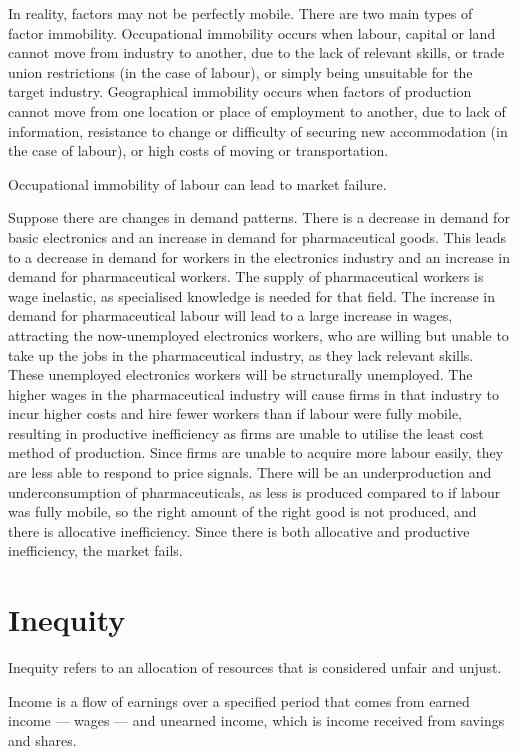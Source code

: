 \documentclass[Economics.tex]{subfiles}
\begin{document}
In reality, factors may not be perfectly mobile. There are two main types of factor immobility. Occupational immobility occurs when labour, capital or land cannot move from industry to another, due to the lack of relevant skills, or trade union restrictions (in the case of labour), or simply being unsuitable for the target industry. Geographical immobility occurs when factors of production cannot move from one location or place of employment to another, due to lack of information, resistance to change or difficulty of securing new accommodation (in the case of labour), or high costs of moving or transportation.

Occupational immobility of labour can lead to market failure.

Suppose there are changes in demand patterns. There is a decrease in demand for basic electronics and an increase in demand for pharmaceutical goods. This leads to a decrease in demand for workers in the electronics industry and an increase in demand for pharmaceutical workers. The supply of pharmaceutical workers is wage inelastic, as specialised knowledge is needed for that field. The increase in demand for pharmaceutical labour will lead to a large increase in wages, attracting the now-unemployed electronics workers, who are willing but unable to take up the jobs in the pharmaceutical industry, as they lack relevant skills. These unemployed electronics workers will be structurally unemployed. The higher wages in the pharmaceutical industry will cause firms in that industry to incur higher costs and hire fewer workers than if labour were fully mobile, resulting in productive inefficiency as firms are unable to utilise the least cost method of production. Since firms are unable to acquire more labour easily, they are less able to respond to price signals. There will be an underproduction and underconsumption of pharmaceuticals, as less is produced compared to if labour was fully mobile, so the right amount of the right good is not produced, and there is allocative inefficiency. Since there is both allocative and productive inefficiency, the market fails.
\section{Inequity}
Inequity refers to an allocation of resources that is considered unfair and unjust.

Income is a flow of earnings over a specified period that comes from earned income --- wages --- and unearned income, which is income received from savings and shares.
\end{document}
